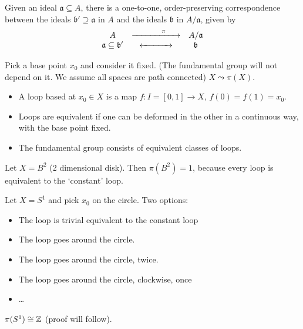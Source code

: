     \begin{theorem}
        Given an ideal \( \mathfrak{a} \subseteq A \), there is a one-to-one, order-preserving correspondence between the ideals \( \mathfrak{b}' \supseteq \mathfrak{a} \) in \( A \) and the ideals \( \mathfrak{b} \) in \( A/\mathfrak{a} \), given by
        \[
        \begin{array}{c@{\quad}c@{\quad}c}
        A & \xrightarrow{\hspace{1.2cm}\pi\hspace{0.5cm}} & A/\mathfrak{a} \\
        \mathfrak{a} \subseteq \mathfrak{b}' & \xleftrightarrow{\hspace{1.2cm}} & \mathfrak{b}
        \end{array}
        \]
    \end{theorem}
        
        

        
        
    

Pick a base point $x_0$ and consider it fixed. (The fundamental group will not depend on it. We assume all spaces are path connected)
$X \leadsto \pi(X)$.
\begin{itemize}
    \item A loop based at $x_0 \in X$ is a map $f: I = [0, 1] \to X$, $f(0) = f(1) = x_0$.
    \item Loops are equivalent if one can be deformed in the other in a continuous way, with the base point fixed.
    \item The fundamental group consists of equivalent classes of loops.
\end{itemize}

\begin{eg}
    Let $X = B^2$ (2 dimensional disk).
    Then $\pi(B^2) = 1$, because every loop is equivalent to the `constant' loop.
\end{eg}
\begin{eg}
    Let $X = S^{1}$ and pick $x_0$ on the circle.
    Two options: 
    \begin{itemize}
        \item The loop is trivial equivalent to the constant loop
        \item The loop goes around the circle.
        \item The loop goes around the circle, twice.
        \item The loop goes around the circle, clockwise, once
        \item \ldots
    \end{itemize}
    $\pi(S^{1}) \cong \mathbb{Z}$ (proof will follow).
\end{eg}

